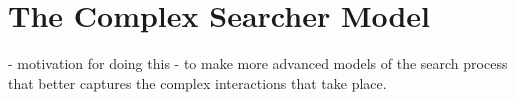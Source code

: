 \section{The Complex Searcher Model}\label{sec:proposal:csm}
%

- motivation for doing this
- to make more advanced models of the search process that better captures the complex interactions that take place.

